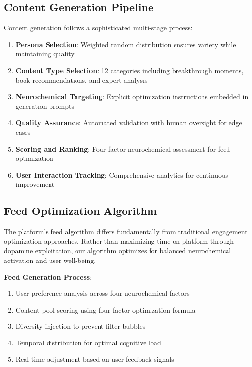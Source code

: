 \documentclass[11pt,letterpaper]{article}
\begin{document}
\subsection{Content Generation Pipeline}

Content generation follows a sophisticated multi-stage process:

\begin{enumerate}
    \item \textbf{Persona Selection}: Weighted random distribution ensures variety while maintaining quality
    \item \textbf{Content Type Selection}: 12 categories including breakthrough moments, book recommendations, and expert analysis
    \item \textbf{Neurochemical Targeting}: Explicit optimization instructions embedded in generation prompts
    \item \textbf{Quality Assurance}: Automated validation with human oversight for edge cases
    \item \textbf{Scoring and Ranking}: Four-factor neurochemical assessment for feed optimization
    \item \textbf{User Interaction Tracking}: Comprehensive analytics for continuous improvement
\end{enumerate}

\subsection{Feed Optimization Algorithm}

The platform's feed algorithm differs fundamentally from traditional engagement optimization approaches. Rather than maximizing time-on-platform through dopamine exploitation, our algorithm optimizes for balanced neurochemical activation and user well-being.

\textbf{Feed Generation Process}:
\begin{enumerate}
    \item User preference analysis across four neurochemical factors
    \item Content pool scoring using four-factor optimization formula
    \item Diversity injection to prevent filter bubbles
    \item Temporal distribution for optimal cognitive load
    \item Real-time adjustment based on user feedback signals
\end{enumerate}
\end{document}

